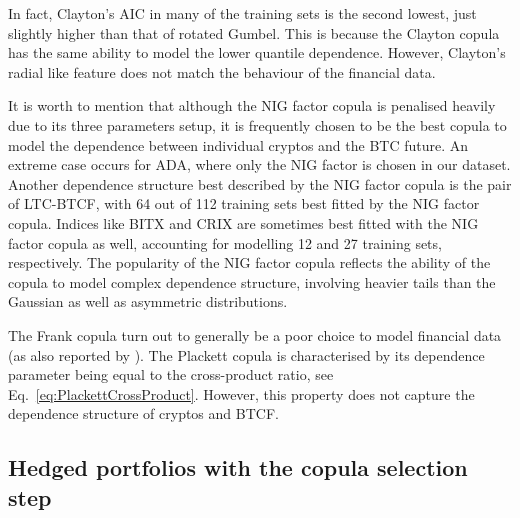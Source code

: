 In fact, Clayton's AIC in many of the training sets is the second
lowest, just slightly higher than that of rotated Gumbel. This is because the
Clayton copula has the same ability to model the lower quantile
dependence. However, Clayton's radial like feature does not match the
behaviour of the financial data. 

It is worth to mention that although the NIG factor copula is
penalised heavily due to its three parameters setup, it is frequently
chosen to be the best copula to model the dependence between
individual cryptos and the BTC future. An extreme case occurs for ADA,
where only the NIG factor is chosen in our dataset. 
Another dependence structure best described by the NIG factor
copula is the pair of LTC-BTCF, with 64 out of 112 training sets best
fitted by the NIG factor copula. Indices like BITX and CRIX are
sometimes best fitted with the NIG factor copula as well, accounting
for modelling 12 and 27 training sets, respectively. 
The popularity of the NIG factor copula reflects the ability of the
copula to model complex dependence structure, involving heavier tails
than the Gaussian as well as asymmetric distributions.


The Frank copula turn out to generally be a poor choice to model financial
data (as also reported by \cite{barbi2014copula}).
The Plackett copula is characterised by its dependence parameter being
equal to the cross-product ratio, see
Eq.~\ref{eq:PlackettCrossProduct}. However, this property
does not capture the dependence structure of cryptos and BTCF.

\subsection{Hedged portfolios with the copula selection step}\label{subsec:HP2}

\afterpage{
  \begin{landscape}
  
\end{landscape}
}

